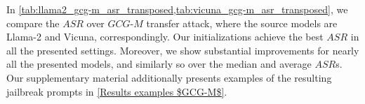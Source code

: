 



In \cref{tab:llama2_gcg-m_asr_transposed,tab:vicuna_gcg-m_asr_transposed}, we compare the $ASR$ over $GCG\text{-}M$ transfer attack, where the source models are Llama-2 and Vicuna, correspondingly. Our initializations achieve the best $ASR$ in all the presented settings. Moreover, we show substantial improvements for nearly all the presented models, and similarly so over the median and average $ASR$s. Our supplementary material additionally presents examples of the resulting jailbreak prompts in \cref{Results examples $GCG-M$}.









